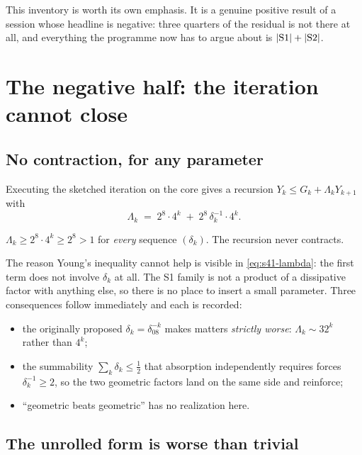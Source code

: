This inventory is worth its own emphasis. It is a genuine positive result of a
session whose headline is negative: three quarters of the residual is not
there at all, and everything the programme now has to argue about is
\(\left|\mathrm{S1}\right|+\left|\mathrm{S2}\right|\).

\section{The negative half: the iteration cannot close}
\label{sec:noclose}

\subsection{No contraction, for any parameter}

Executing the sketched iteration on the core gives a recursion
\(Y_k\le G_k+\Lambda_k Y_{k+1}\) with
\begin{equation}\label{eq:s41-lambda}
  \Lambda_k \;=\; 2^{8}\cdot4^{k} \;+\; 2^{8}\,\delta_k^{-1}\cdot4^{k}.
\end{equation}

\begin{statement}
\label{st:nocontraction}
\IMPOSSIBLE{} \(\Lambda_k\ge2^{8}\cdot4^{k}\ge2^{8}>1\) for \emph{every}
sequence \((\delta_k)\). The recursion never contracts.
\end{statement}

The reason Young's inequality cannot help is visible in
\eqref{eq:s41-lambda}: the first term does not involve \(\delta_k\) at all.
The S1 family is not a product of a dissipative factor with anything else, so
there is no place to insert a small parameter. Three consequences follow
immediately and each is recorded:

\begin{itemize}[leftmargin=1.6em]
\item the originally proposed \(\delta_k=\delta_08^{-k}\) makes matters
  \emph{strictly worse}: \(\Lambda_k\sim32^k\) rather than \(4^k\);
\item the summability \(\sum_k\delta_k\le\tfrac12\) that absorption
  independently requires forces \(\delta_k^{-1}\ge2\), so the two geometric
  factors land on the same side and reinforce;
\item ``geometric beats geometric'' has no realization here.
\end{itemize}

\subsection{The unrolled form is worse than trivial}

